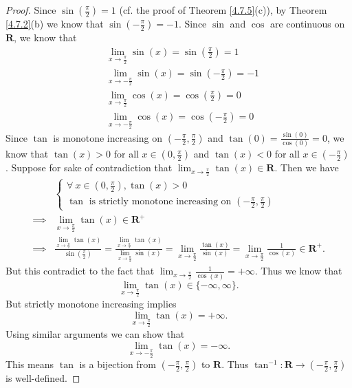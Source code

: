 \begin{proof}
    Since \(\sin(\frac{\pi}{2}) = 1\) (cf. the proof of Theorem \ref{4.7.5}(c)), by Theorem \ref{4.7.2}(b) we know that \(\sin(-\frac{\pi}{2}) = -1\).
    Since \(\sin\) and \(\cos\) are continuous on \(\mathbf{R}\), we know that
    \begin{align*}
         & \lim_{x \to \frac{\pi}{2}} \sin(x) = \sin(\frac{\pi}{2}) = 1    \\
         & \lim_{x \to -\frac{\pi}{2}} \sin(x) = \sin(-\frac{\pi}{2}) = -1 \\
         & \lim_{x \to \frac{\pi}{2}} \cos(x) = \cos(\frac{\pi}{2}) = 0    \\
         & \lim_{x \to -\frac{\pi}{2}} \cos(x) = \cos(-\frac{\pi}{2}) = 0
    \end{align*}
    Since \(\tan\) is monotone increasing on \((-\frac{\pi}{2}, \frac{\pi}{2})\) and \(\tan(0) = \frac{\sin(0)}{\cos(0)} = 0\), we know that \(\tan(x) > 0\) for all \(x \in (0, \frac{\pi}{2})\) and \(\tan(x) < 0\) for all \(x \in (-\frac{\pi}{2})\).
    Suppose for sake of contradiction that \(\lim_{x \to \frac{\pi}{2}} \tan(x) \in \mathbf{R}\).
    Then we have
    \begin{align*}
                 & \begin{cases}
            \forall\ x \in (0, \frac{\pi}{2}), \tan(x) > 0 \\
            \tan \text{ is strictly monotone increasing on } (-\frac{\pi}{2}, \frac{\pi}{2})
        \end{cases}                                                                                                                                                                                                                                           \\
        \implies & \lim_{x \to \frac{\pi}{2}} \tan(x) \in \mathbf{R}^+                                                                                                                                                                                                                  \\
        \implies & \frac{\lim_{x \to \frac{\pi}{2}} \tan(x)}{\sin(\frac{\pi}{2})} = \frac{\lim_{x \to \frac{\pi}{2}} \tan(x)}{\lim_{x \to \frac{\pi}{2}} \sin(x)} = \lim_{x \to \frac{\pi}{2}} \frac{\tan(x)}{\sin(x)} = \lim_{x \to \frac{\pi}{2}} \frac{1}{\cos(x)} \in \mathbf{R}^+.
    \end{align*}
    But this contradict to the fact that \(\lim_{x \to \frac{\pi}{2}} \frac{1}{\cos(x)} = +\infty\).
    Thus we know that
    \[
        \lim_{x \to \frac{\pi}{2}} \tan(x) \in \{-\infty, \infty\}.
    \]
    But strictly monotone increasing implies
    \[
        \lim_{x \to \frac{\pi}{2}} \tan(x) = +\infty.
    \]
    Using similar arguments we can show that
    \[
        \lim_{x \to -\frac{\pi}{2}} \tan(x) = -\infty.
    \]
    This means \(\tan\) is a bijection from \((-\frac{\pi}{2}, \frac{\pi}{2})\) to \(\mathbf{R}\).
    Thus \(\tan^{-1} : \mathbf{R} \to (-\frac{\pi}{2}, \frac{\pi}{2})\) is well-defined.


\end{proof}
